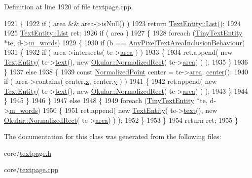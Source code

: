 Definition at line 1920 of file textpage.\+cpp.


\begin{DoxyCode}
1921 \{
1922     \textcolor{keywordflow}{if} ( area && area->isNull() )
1923         \textcolor{keywordflow}{return} \hyperlink{classQList}{TextEntity::List}();
1924 
1925     \hyperlink{classQList}{TextEntity::List} ret;
1926     \textcolor{keywordflow}{if} ( area )
1927     \{
1928         \textcolor{keywordflow}{foreach} (\hyperlink{classTinyTextEntity}{TinyTextEntity} *te, d->\hyperlink{classOkular_1_1TextPagePrivate_a36b703334a8775136cb4308209afd1cb}{m\_words})
1929         \{
1930             \textcolor{keywordflow}{if} (b == \hyperlink{classOkular_1_1TextPage_a07b135c84863f18df1d08e95aeeffd34a37eee044832944a9f31f7a9d3d39e0dd}{AnyPixelTextAreaInclusionBehaviour})
1931             \{
1932                 \textcolor{keywordflow}{if} ( area->intersects( te->\hyperlink{classTinyTextEntity_a8b5dce783e679c307cfd36f67e2fb521}{area} ) )
1933                 \{
1934                     ret.append( \textcolor{keyword}{new} \hyperlink{classOkular_1_1TextEntity}{TextEntity}( te->\hyperlink{classTinyTextEntity_a9657105c457630e898ea823ddc87d278}{text}(), \textcolor{keyword}{new} 
      \hyperlink{classOkular_1_1NormalizedRect}{Okular::NormalizedRect}( te->\hyperlink{classTinyTextEntity_a8b5dce783e679c307cfd36f67e2fb521}{area}) ) );
1935                 \}
1936             \}
1937             \textcolor{keywordflow}{else}
1938             \{
1939                 \textcolor{keyword}{const} \hyperlink{classOkular_1_1NormalizedPoint}{NormalizedPoint} center = te->\hyperlink{classTinyTextEntity_a8b5dce783e679c307cfd36f67e2fb521}{area}.
      \hyperlink{classOkular_1_1NormalizedRect_ac5c7173b01ac84afe38cd0c93b653435}{center}();
1940                 \textcolor{keywordflow}{if} ( area->contains( center.\hyperlink{classOkular_1_1NormalizedPoint_a857f49b9bc7712430d167472ef9dbd94}{x}, center.\hyperlink{classOkular_1_1NormalizedPoint_ac2276daabda627d5f82bb1532c293047}{y} ) )
1941                 \{
1942                     ret.append( \textcolor{keyword}{new} \hyperlink{classOkular_1_1TextEntity}{TextEntity}( te->\hyperlink{classTinyTextEntity_a9657105c457630e898ea823ddc87d278}{text}(), \textcolor{keyword}{new} 
      \hyperlink{classOkular_1_1NormalizedRect}{Okular::NormalizedRect}( te->\hyperlink{classTinyTextEntity_a8b5dce783e679c307cfd36f67e2fb521}{area}) ) );
1943                 \}
1944             \}
1945         \}
1946     \}
1947     \textcolor{keywordflow}{else}
1948     \{
1949         \textcolor{keywordflow}{foreach} (\hyperlink{classTinyTextEntity}{TinyTextEntity} *te, d->\hyperlink{classOkular_1_1TextPagePrivate_a36b703334a8775136cb4308209afd1cb}{m\_words})
1950         \{
1951             ret.append( \textcolor{keyword}{new} \hyperlink{classOkular_1_1TextEntity}{TextEntity}( te->\hyperlink{classTinyTextEntity_a9657105c457630e898ea823ddc87d278}{text}(), \textcolor{keyword}{new} 
      \hyperlink{classOkular_1_1NormalizedRect}{Okular::NormalizedRect}( te->\hyperlink{classTinyTextEntity_a8b5dce783e679c307cfd36f67e2fb521}{area}) ) );
1952         \}
1953     \}
1954     \textcolor{keywordflow}{return} ret;
1955 \}
\end{DoxyCode}


The documentation for this class was generated from the following files\+:\begin{DoxyCompactItemize}
\item 
core/\hyperlink{textpage_8h}{textpage.\+h}\item 
core/\hyperlink{textpage_8cpp}{textpage.\+cpp}\end{DoxyCompactItemize}
